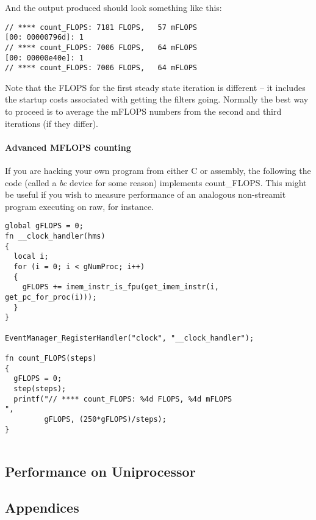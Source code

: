 And the output produced should look something like this:
\begin{verbatim}
// **** count_FLOPS: 7181 FLOPS,   57 mFLOPS
[00: 00000796d]: 1
// **** count_FLOPS: 7006 FLOPS,   64 mFLOPS
[00: 00000e40e]: 1
// **** count_FLOPS: 7006 FLOPS,   64 mFLOPS
\end{verbatim}

Note that the FLOPS for the first steady state iteration is different -- 
it includes the startup costs associated with getting the filters going. Normally the best 
way to proceed is to average the mFLOPS numbers from the second and
third iterations (if they differ).

\paragraph{Advanced MFLOPS counting}
If you are hacking your own program from either C or assembly, 
the following the code (called a \textit{bc} device for some reason) implements count\_FLOPS.
This might be useful if you wish to measure performance of an analogous non-streamit
program executing on raw, for instance.

\begin{verbatim}
global gFLOPS = 0;
fn __clock_handler(hms)
{
  local i;
  for (i = 0; i < gNumProc; i++)
  {
    gFLOPS += imem_instr_is_fpu(get_imem_instr(i, get_pc_for_proc(i)));
  }
}

EventManager_RegisterHandler("clock", "__clock_handler");

fn count_FLOPS(steps)
{
  gFLOPS = 0;
  step(steps);
  printf("// **** count_FLOPS: %4d FLOPS, %4d mFLOPS
",
         gFLOPS, (250*gFLOPS)/steps);
}


\end{verbatim}

\subsection{Performance on Uniprocessor}

\subsection{Appendices}
